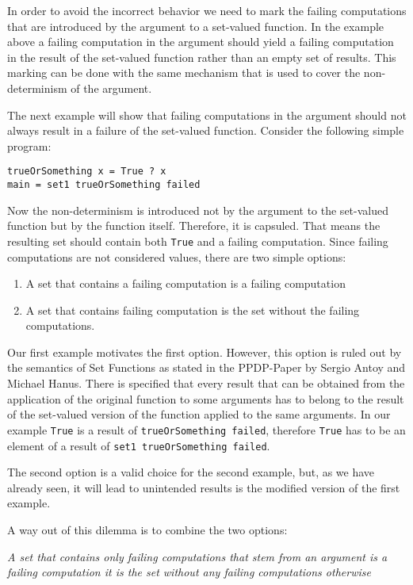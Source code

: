 \documentclass{article}
\begin{document}
In order to avoid the incorrect behavior we need to mark the failing computations
that are introduced by the argument to a set-valued function. In the example
above a failing computation in the argument should yield a failing computation
in the result of the set-valued function rather than an empty set of results.
This marking can be done with the same mechanism that is used to cover the
non-determinism of the argument.

The next example will show that failing computations in the argument should
not always result in a failure of the set-valued function. Consider the
following simple program:

\begin{lstlisting}
trueOrSomething x = True ? x
main = set1 trueOrSomething failed
\end{lstlisting}

Now the non-determinism is introduced not by the argument to the set-valued function
but by the function itself. Therefore, it is capsuled. That means the resulting set
should contain both \lstinline{True} and a failing computation. Since failing
computations are not considered values, there are two simple options:
\begin{enumerate}
\item A set that contains a failing computation is a failing computation
\item A set that contains failing computation is the set without the
      failing computations.
\end{enumerate}

Our first example motivates the first option. However, this option is ruled out
by the semantics of Set Functions as stated in the PPDP-Paper by Sergio Antoy
and Michael Hanus. There is specified that every result that can be obtained
from the application of the original function to some arguments has to belong
to the result of the set-valued version of the function applied to the same
arguments. In our example \lstinline{True} is a result of 
\lstinline{trueOrSomething failed}, therefore \lstinline{True} has to be an
element of a result of \lstinline{set1 trueOrSomething failed}.

The second option is a valid choice for the second example, but, as we have
already seen, it will lead to unintended results is the modified version
of the first example.

A way out of this dilemma is to combine the two options:

\textit{A set that contains only failing computations that stem from an argument
        is a failing computation it is the set without any failing computations
        otherwise}
\end{document}
